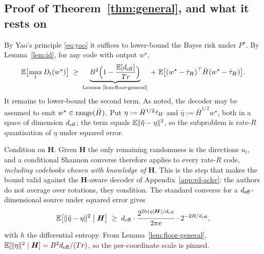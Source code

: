 \subsection{Proof of Theorem~\ref{thm:general}, and what it rests on}

By Yao's principle \eqref{eq:yao} it suffices to lower-bound the Bayes risk
under $P^\star$. By Lemma~\ref{lem:id}, for any code with output $w^\star$,
\begin{equation*}
  \mathbb{E}\bigl[\max_t D_t(w^\star)\bigr]
  \;\geq\;
  \underbrace{B^2\Bigl(1 - \frac{\mathbb{E}[d_{\mathrm{eff}}]}{Tr}\Bigr)}_{\text{Lemma
  \ref{lem:floor-general}}}
  \;+\;
  \mathbb{E}\bigl[(w^\star-\bar{\tau}_H)^\top \bar H (w^\star-\bar{\tau}_H)\bigr].
\end{equation*}
It remains to lower-bound the second term. As noted, the decoder may be
assumed to emit $w^\star \in \operatorname{range}(\bar H)$. Put
$\eta := \bar H^{1/2}\bar{\tau}_H$ and $\hat\eta := \bar H^{1/2} w^\star$, both in a
space of dimension $d_{\mathrm{eff}}$; the term equals $\mathbb{E}\|\hat\eta - \eta\|^2$, so the
subproblem is rate-$R$ quantisation of $\eta$ under squared error.

Condition on $\boldsymbol H$. Given $\boldsymbol H$ the only remaining
randomness is the directions $u_t$, and a conditional Shannon converse
therefore applies to every rate-$R$ code, \emph{including codebooks chosen
with knowledge of $\boldsymbol H$}. This is the step that makes the bound valid
against the $\boldsymbol H$-aware decoder of Appendix~\ref{app:rd-achv}: the authors do not
average over rotations, they condition. The standard converse for a
$d_{\mathrm{eff}}$-dimensional source under squared error gives
\begin{equation*}
  \mathbb{E}\bigl[\|\hat\eta - \eta\|^2 \bigm| \boldsymbol H\bigr]
  \;\geq\; d_{\mathrm{eff}} \cdot \frac{2^{2h(\eta \mid \boldsymbol H)/d_{\mathrm{eff}}}}
  {2\pi e}\cdot 2^{-2R/d_{\mathrm{eff}}},
\end{equation*}
with $h$ the differential entropy. From Lemma~\ref{lem:floor-general},
$\mathbb{E}[\|\eta\|^2 \mid \boldsymbol H] = B^2d_{\mathrm{eff}}/(Tr)$, so the per-coordinate
scale is pinned.

